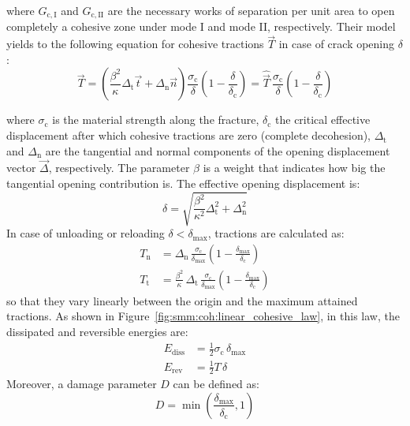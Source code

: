 where $G_\mathrm{c, I}$ and $G_\mathrm{c, II}$ are the
necessary works of separation per unit area to open completely a
cohesive zone under mode I and mode II, respectively. Their model yields to the
following equation for cohesive tractions $\vec{T}$ in case of crack
opening ${\delta}$:
\begin{equation}
  \label{eq:smm:coh:tractions}
  \vec{T} = \left( \frac{\beta^2}{\kappa} \Delta_\mathrm{t} \vec{t} +
    \Delta_\mathrm{n} \vec{n} \right)
  \frac{\sigma_\mathrm{c}}{\delta}
  \left( 1- \frac{\delta}{\delta_\mathrm{c}} \right)
  = \hat{\vec T}\,
  \frac{\sigma_\mathrm{c}}{\delta}
  \left( 1- \frac{\delta}{\delta_\mathrm{c}} \right)
\end{equation}

where $\sigma_\mathrm{c}$ is the material strength along the fracture,
$\delta_\mathrm{c}$ the critical effective displacement after which
cohesive tractions are zero (complete decohesion), $\Delta_\mathrm{t}$
and $\Delta_\mathrm{n}$ are the tangential and normal components of
the opening displacement vector $\vec{\Delta}$, respectively. The
parameter $\beta$ is a weight that indicates how big the tangential
opening contribution is. The effective opening displacement is:
\begin{equation}
  \delta = \sqrt{\frac{\beta^2}{\kappa^2} \Delta_\mathrm{t}^2 +
    \Delta_\mathrm{n}^2}
\end{equation}
In case of unloading or reloading $\delta < \delta_\mathrm{max}$,
tractions are calculated as:
\begin{align}
  T_\mathrm{n} &= \Delta_\mathrm{n}\,
  \frac{\sigma_\mathrm{c}}{\delta_\mathrm{max}}
  \left( 1- \frac{\delta_\mathrm{max}}{\delta_\mathrm{c}} \right) \\
  T_\mathrm{t} &= \frac{\beta^2}{\kappa}\, \Delta_\mathrm{t}\,
  \frac{\sigma_\mathrm{c}}{\delta_\mathrm{max}}
  \left( 1- \frac{\delta_\mathrm{max}}{\delta_\mathrm{c}} \right)
\end{align}
so that they vary linearly between the origin and the maximum attained
tractions. As shown in Figure~\ref{fig:smm:coh:linear_cohesive_law},
in this law, the dissipated and reversible energies are:
\begin{align}
  E_\mathrm{diss} &= \frac{1}{2} \sigma_\mathrm{c}\, \delta_\mathrm{max}\\[1ex]
  E_\mathrm{rev} &= \frac{1}{2} T\, \delta
\end{align}
Moreover, a damage parameter $D$ can be defined as:
\begin{equation}
  D = \min \left(
    \frac{\delta_\mathrm{max}}{\delta_\mathrm{c}},1 \right)
\end{equation}
